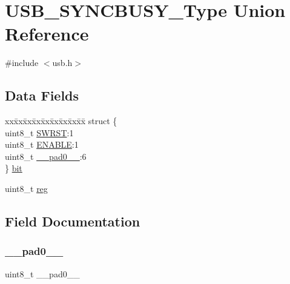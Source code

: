 \hypertarget{union_u_s_b___s_y_n_c_b_u_s_y___type}{}\section{U\+S\+B\+\_\+\+S\+Y\+N\+C\+B\+U\+S\+Y\+\_\+\+Type Union Reference}
\label{union_u_s_b___s_y_n_c_b_u_s_y___type}


{\ttfamily \#include $<$usb.\+h$>$}

\subsection*{Data Fields}
\begin{DoxyCompactItemize}
\item 
\begin{tabbing}
xx\=xx\=xx\=xx\=xx\=xx\=xx\=xx\=xx\=\kill
struct \{\\
\>uint8\_t \mbox{\hyperlink{union_u_s_b___s_y_n_c_b_u_s_y___type_a9334d5ac0548802c90a8129c52c8e490}{SWRST}}:1\\
\>uint8\_t \mbox{\hyperlink{union_u_s_b___s_y_n_c_b_u_s_y___type_a2b3662f1b123463ae1a23c1f324e5cc5}{ENABLE}}:1\\
\>uint8\_t \mbox{\hyperlink{union_u_s_b___s_y_n_c_b_u_s_y___type_a8b4eebe79ded0459acec2f4950102ba3}{\_\_pad0\_\_}}:6\\
\} \mbox{\hyperlink{union_u_s_b___s_y_n_c_b_u_s_y___type_afbffe4d6f9c0d71c23faf9e6be64d207}{bit}}\\

\end{tabbing}\item 
uint8\+\_\+t \mbox{\hyperlink{union_u_s_b___s_y_n_c_b_u_s_y___type_a9428adc9af4653a2050e2536b55dec8d}{reg}}
\end{DoxyCompactItemize}


\subsection{Field Documentation}
\mbox{\label{union_u_s_b___s_y_n_c_b_u_s_y___type_a8b4eebe79ded0459acec2f4950102ba3}} 
\subsubsection{\texorpdfstring{\_\_pad0\_\_}{\_\_pad0\_\_}}
{\footnotesize\ttfamily uint8\+\_\+t \+\_\+\+\_\+pad0\+\_\+\+\_\+}

